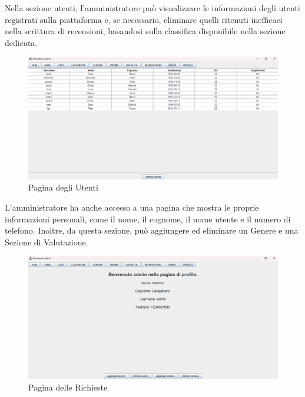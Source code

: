 \documentclass[a4paper,12pt]{report}
\begin{document}
Nella sezione utenti, l'amministratore può visualizzare le informazioni degli utenti registrati sulla piattaforma e, se necessario, eliminare quelli ritenuti inefficaci nella scrittura di recensioni, basandosi sulla classifica disponibile nella sezione dedicata. \\
\begin{figure}[H]
	\centering
	\includegraphics[width=375pt]{appimg/adminImages/sezioneutenti.png}
	\caption{Pagina degli Utenti}
\end{figure}

L'amministratore ha anche accesso a una pagina che mostra le proprie informazioni personali, come il nome, il cognome, il nome utente e il numero di telefono. Inoltre, da questa sezione, può aggiungere ed eliminare un Genere e una Sezione di Valutazione. \\
\begin{figure}[H]
	\centering
	\includegraphics[width=375pt]{appimg/adminImages/sezioneprofilo.png}
	\caption{Pagina delle Richieste}
\end{figure}
\end{document}
